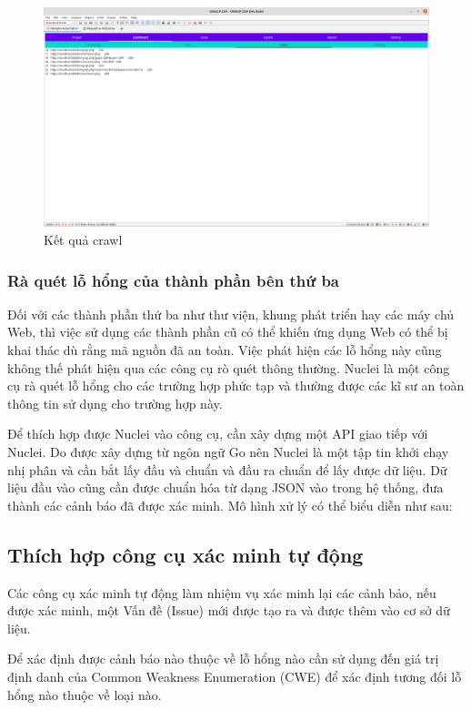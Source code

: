 \documentclass[./../main.tex]{subfiles}
\begin{document}
\begin{figure}[h!]
	\includegraphics[width=\linewidth]{./images/scan_result.png}
	\caption{Kết quả crawl}
	\label{fig:scan_result}
\end{figure}

\subsubsection{Rà quét lỗ hổng của thành phần bên thứ ba}

Đối với các thành phần thứ ba như thư viện, khung phát triển hay các máy chủ Web,
thì việc sử dụng các thành phần cũ có thể khiến ứng dụng Web có thể bị khai thác
dù rằng mã nguồn đã an toàn. Việc phát hiện các lỗ hổng này cũng không thế  phát
hiện qua các công cụ rò quét thông thường. Nuclei là một công cụ rà quét lỗ hổng
cho các trường hợp phức tạp và thường được các kĩ sư an toàn thông tin sử dụng cho
trường hợp này.

Để thích hợp được Nuclei vào công cụ, cần xây dựng một API giao tiếp với Nuclei. Do
được xây dựng từ ngôn ngữ Go nên Nuclei là một tập tin khởi chạy nhị phân và cần bắt
lấy đầu và chuẩn và đầu ra chuẩn để lấy được dữ liệu. Dữ liệu đầu vào cũng cần được
chuẩn hóa từ dạng JSON vào trong hệ thống, đưa thành các cảnh báo đã được xác minh.
Mô hình xử lý có thể biểu diễn như sau:

\subsection{Thích hợp công cụ xác minh tự động}

Các công cụ xác minh tự động làm nhiệm vụ xác minh lại các cảnh bảo,
nếu được xác minh, một Vấn đề (Issue) mới được tạo ra và được thêm vào cơ sở dữ
liệu.

Để xác định được cảnh báo nào thuộc về lỗ hổng nào cần sử dụng đến
giá trị định danh của Common Weakness Enumeration (CWE) để xác định
tương đối lỗ hổng nào thuộc về loại nào.
\end{document}
